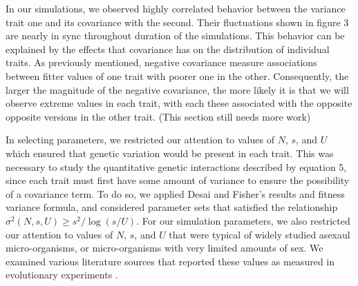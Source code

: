 \documentclass[11pt,twocolumn]{article}
\begin{document}
In our simulations, we observed highly correlated behavior between the variance trait one and its covariance with the second.  Their fluctuations shown in figure 3 are nearly in sync throughout duration of the simulations. This behavior can be explained by the effects that covariance has on the distribution of individual traits.  As previously mentioned, negative covariance measure associations between fitter values of one trait with poorer one in the other.  Consequently, the larger the magnitude of the negative covariance, the more likely it is that we will observe extreme values in each trait, with each these associated with the opposite opposite versions in the other trait.   (This section still needs more work)\par

In selecting parameters, we restricted our attention to values of $N$, $s$, and $U$ which ensured that genetic variation would be present in each trait. This was necessary to study the quantitative genetic interactions described  by equation 5, since each trait must first have some amount of variance to ensure the possibility of a covariance term.  To do so, we applied Desai and Fisher's results and fitness variance formula, and considered parameter sets that satisfied the relationship $\sigma^2(N,s,U) \geq s^2 / \log(s/U)$. For our simulation parameters, we also restricted our attention to values of $N$, $s$, and $U$ that were typical of widely studied asexaul micro-organisms, or micro-organisms with very limited amounts of sex. We examined various literature sources that reported these values as measured in evolutionary experiments \citep{Perfeito2007,desai2007speed,Levy2015}. 
\end{document}

